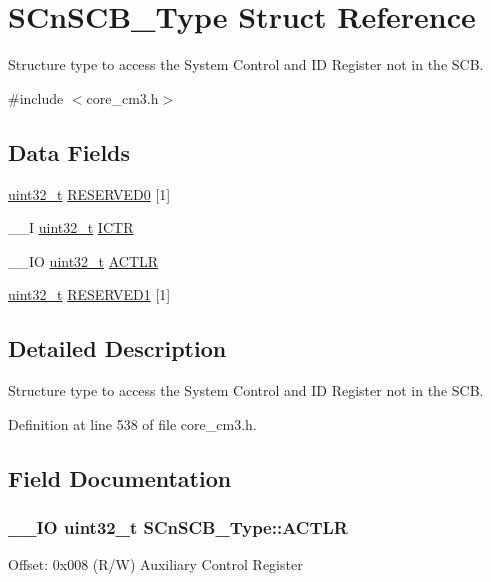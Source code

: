\hypertarget{struct_s_cn_s_c_b___type}{\section{S\-Cn\-S\-C\-B\-\_\-\-Type Struct Reference}
\label{struct_s_cn_s_c_b___type}
}


Structure type to access the System Control and I\-D Register not in the S\-C\-B.  




{\ttfamily \#include $<$core\-\_\-cm3.\-h$>$}

\subsection*{Data Fields}
\begin{DoxyCompactItemize}
\item 
\hyperlink{stdint_8h_a435d1572bf3f880d55459d9805097f62}{uint32\-\_\-t} \hyperlink{struct_s_cn_s_c_b___type_a9c1cf408b90b40c62f396da41416290f}{R\-E\-S\-E\-R\-V\-E\-D0} \mbox{[}1\mbox{]}
\item 
\-\_\-\-\_\-\-I \hyperlink{stdint_8h_a435d1572bf3f880d55459d9805097f62}{uint32\-\_\-t} \hyperlink{struct_s_cn_s_c_b___type_ad99a25f5d4c163d9005ca607c24f6a98}{I\-C\-T\-R}
\item 
\-\_\-\-\_\-\-I\-O \hyperlink{stdint_8h_a435d1572bf3f880d55459d9805097f62}{uint32\-\_\-t} \hyperlink{struct_s_cn_s_c_b___type_aacadedade30422fed705e8dfc8e6cd8d}{A\-C\-T\-L\-R}
\item 
\hyperlink{stdint_8h_a435d1572bf3f880d55459d9805097f62}{uint32\-\_\-t} \hyperlink{struct_s_cn_s_c_b___type_aa4e25c7691de11dd20a02d4732111496}{R\-E\-S\-E\-R\-V\-E\-D1} \mbox{[}1\mbox{]}
\end{DoxyCompactItemize}


\subsection{Detailed Description}
Structure type to access the System Control and I\-D Register not in the S\-C\-B. 

Definition at line 538 of file core\-\_\-cm3.\-h.



\subsection{Field Documentation}
\hypertarget{struct_s_cn_s_c_b___type_aacadedade30422fed705e8dfc8e6cd8d}{
\subsubsection[{A\-C\-T\-L\-R}]{\setlength{\rightskip}{0pt plus 5cm}\-\_\-\-\_\-\-I\-O {\bf uint32\-\_\-t} S\-Cn\-S\-C\-B\-\_\-\-Type\-::\-A\-C\-T\-L\-R}}\label{struct_s_cn_s_c_b___type_aacadedade30422fed705e8dfc8e6cd8d}
Offset\-: 0x008 (R/\-W) Auxiliary Control Register 


